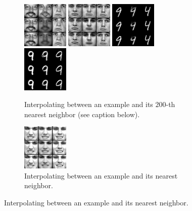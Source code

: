 \begin{figure}
\centering
\begin{subfigure}{1.\textwidth}
\caption{Interpolating between an example and its $200$-th nearest neighbor (see caption below).}
    \includegraphics[width=0.24\textwidth]{article3/images/100interpolationtfdfold1_cae2_samples812data_image_noncen.png}
    \includegraphics[width=0.24\textwidth]{article3/images/100interpolationtfdfold1_rbm2_samples1data_image_noncen.png}
    \includegraphics[width=0.24\textwidth]{article3/images/200interpolationmnist28_cae2_samples1data_image_noncen.png}
    \includegraphics[width=0.24\textwidth]{article3/images/200interpolationmnist28_rbm2_samples51data_image_noncen.png}
\end{subfigure}
\begin{subfigure}{1.\textwidth}
\caption{Interpolating between an example and its nearest neighbor.}
    \includegraphics[width=0.24\textwidth]{article3/images/1interpolationtfdfold1_cae2_samples6data_image_noncen.png}

\end{subfigure}
\end{figure}

